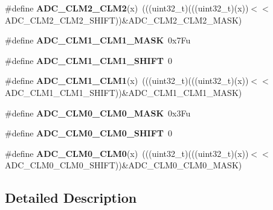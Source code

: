 \begin{DoxyCompactItemize}
\item 
\#define {\bfseries A\+D\+C\+\_\+\+C\+L\+M2\+\_\+\+C\+L\+M2}(x)~(((uint32\+\_\+t)(((uint32\+\_\+t)(x))$<$$<$A\+D\+C\+\_\+\+C\+L\+M2\+\_\+\+C\+L\+M2\+\_\+\+S\+H\+I\+FT))\&A\+D\+C\+\_\+\+C\+L\+M2\+\_\+\+C\+L\+M2\+\_\+\+M\+A\+SK)\hypertarget{group__ADC__Register__Masks_ga2366c7a7142228c95c81d4d11c90b2b1}{}\label{group__ADC__Register__Masks_ga2366c7a7142228c95c81d4d11c90b2b1}

\item 
\#define {\bfseries A\+D\+C\+\_\+\+C\+L\+M1\+\_\+\+C\+L\+M1\+\_\+\+M\+A\+SK}~0x7\+Fu\hypertarget{group__ADC__Register__Masks_gaf576a4eb27b1478ea37a1b35bf6b869f}{}\label{group__ADC__Register__Masks_gaf576a4eb27b1478ea37a1b35bf6b869f}

\item 
\#define {\bfseries A\+D\+C\+\_\+\+C\+L\+M1\+\_\+\+C\+L\+M1\+\_\+\+S\+H\+I\+FT}~0\hypertarget{group__ADC__Register__Masks_gae83765be6a54aab249c89a0f47afb023}{}\label{group__ADC__Register__Masks_gae83765be6a54aab249c89a0f47afb023}

\item 
\#define {\bfseries A\+D\+C\+\_\+\+C\+L\+M1\+\_\+\+C\+L\+M1}(x)~(((uint32\+\_\+t)(((uint32\+\_\+t)(x))$<$$<$A\+D\+C\+\_\+\+C\+L\+M1\+\_\+\+C\+L\+M1\+\_\+\+S\+H\+I\+FT))\&A\+D\+C\+\_\+\+C\+L\+M1\+\_\+\+C\+L\+M1\+\_\+\+M\+A\+SK)\hypertarget{group__ADC__Register__Masks_gac77d03fd2d07583049ec6496092b3a40}{}\label{group__ADC__Register__Masks_gac77d03fd2d07583049ec6496092b3a40}

\item 
\#define {\bfseries A\+D\+C\+\_\+\+C\+L\+M0\+\_\+\+C\+L\+M0\+\_\+\+M\+A\+SK}~0x3\+Fu\hypertarget{group__ADC__Register__Masks_ga2f9f36fb3b4eceab2198582865dc5b14}{}\label{group__ADC__Register__Masks_ga2f9f36fb3b4eceab2198582865dc5b14}

\item 
\#define {\bfseries A\+D\+C\+\_\+\+C\+L\+M0\+\_\+\+C\+L\+M0\+\_\+\+S\+H\+I\+FT}~0\hypertarget{group__ADC__Register__Masks_gaf5a5fd710a47f83c5ee3fd083f430a66}{}\label{group__ADC__Register__Masks_gaf5a5fd710a47f83c5ee3fd083f430a66}

\item 
\#define {\bfseries A\+D\+C\+\_\+\+C\+L\+M0\+\_\+\+C\+L\+M0}(x)~(((uint32\+\_\+t)(((uint32\+\_\+t)(x))$<$$<$A\+D\+C\+\_\+\+C\+L\+M0\+\_\+\+C\+L\+M0\+\_\+\+S\+H\+I\+FT))\&A\+D\+C\+\_\+\+C\+L\+M0\+\_\+\+C\+L\+M0\+\_\+\+M\+A\+SK)\hypertarget{group__ADC__Register__Masks_ga388deb317a8fa21fa77fc0d5df262966}{}\label{group__ADC__Register__Masks_ga388deb317a8fa21fa77fc0d5df262966}

\end{DoxyCompactItemize}


\subsection{Detailed Description}
